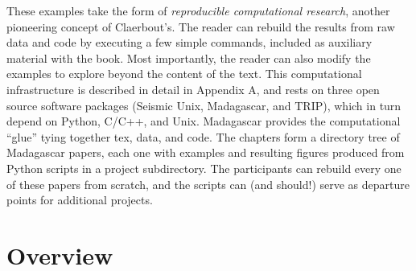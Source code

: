These examples take the form of {\em reproducible computational research}, another pioneering concept of Claerbout's. The reader can rebuild the results from raw data and code by executing a few simple commands, included as auxiliary material with the book. Most importantly, the reader can also modify the examples to explore beyond the content of the text.
This computational infrastructure is described in detail in Appendix A, and rests on three open source software packages (Seismic Unix, Madagascar, and TRIP), which in turn depend on Python, C/C++, and Unix. Madagascar provides the computational ``glue'' tying together tex, data, and code. The chapters form a directory tree of Madagascar papers, each one with examples and resulting figures produced from Python scripts in a project subdirectory. The participants can rebuild every one of these papers from scratch, and the scripts can (and should!) serve as departure points for additional projects.


\section{Overview}

